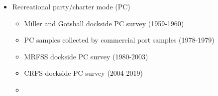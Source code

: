 \documentclass[11pt,
  english,
]{article}
\begin{document}
\begin{itemize}
\item

  Recreational party/charter mode (PC)

  \tagmcend\tagstructend\tagstructend


  \begin{itemize}
  \item


    Miller and Gotshall dockside PC survey (1959-1960)

    \tagmcend\tagstructend\tagstructend

    \tagmcend\tagstructend\tagstructend
  \item


    PC samples collected by commercial port samples (1978-1979)

    \tagmcend\tagstructend\tagstructend

    \tagmcend\tagstructend\tagstructend
  \item


    MRFSS dockside PC survey (1980-2003)

    \tagmcend\tagstructend\tagstructend

    \tagmcend\tagstructend\tagstructend
  \item


    CRFS dockside PC survey (2004-2019)

    \tagmcend\tagstructend\tagstructend

    \tagmcend\tagstructend\tagstructend
  \item


\end{itemize}
\end{itemize}
\end{document}
